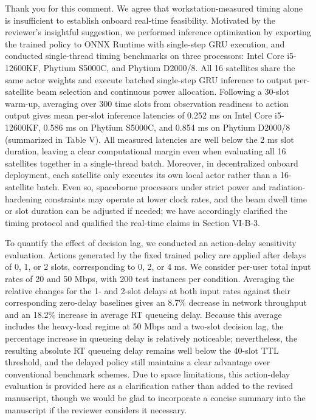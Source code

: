 \documentclass[11pt,a4paper]{article}
\begin{document}
Thank you for this comment. We agree that workstation-measured timing alone is insufficient to establish onboard real-time feasibility. Motivated by the reviewer's insightful suggestion, we performed inference optimization by exporting the trained policy to ONNX Runtime with single-step GRU execution, and conducted single-thread timing benchmarks on three processors: Intel Core i5-12600KF, Phytium S5000C, and Phytium D2000/8. All 16 satellites share the same actor weights and execute batched single-step GRU inference to output per-satellite beam selection and continuous power allocation. Following a 30-slot warm-up, averaging over 300 time slots from observation readiness to action output gives mean per-slot inference latencies of 0.252 ms on Intel Core i5-12600KF, 0.586 ms on Phytium S5000C, and 0.854 ms on Phytium D2000/8 (summarized in Table V). All measured latencies are well below the 2 ms slot duration, leaving a clear computational margin even when evaluating all 16 satellites together in a single-thread batch. Moreover, in decentralized onboard deployment, each satellite only executes its own local actor rather than a 16-satellite batch. Even so, spaceborne processors under strict power and radiation-hardening constraints may operate at lower clock rates, and the beam dwell time or slot duration can be adjusted if needed; we have accordingly clarified the timing protocol and qualified the real-time claims in Section VI-B-3.
\par

To quantify the effect of decision lag, we conducted an action-delay sensitivity evaluation. Actions generated by the fixed trained policy are applied after delays of 0, 1, or 2 slots, corresponding to 0, 2, or 4 ms. We consider per-user total input rates of 20 and 50 Mbps, with 200 test instances per condition. Averaging the relative changes for the 1- and 2-slot delays at both input rates against their corresponding zero-delay baselines gives an 8.7\% decrease in network throughput and an 18.2\% increase in average RT queueing delay. Because this average includes the heavy-load regime at 50 Mbps and a two-slot decision lag, the percentage increase in queueing delay is relatively noticeable; nevertheless, the resulting absolute RT queueing delay remains well below the 40-slot TTL threshold, and the delayed policy still maintains a clear advantage over conventional benchmark schemes. Due to space limitations, this action-delay evaluation is provided here as a clarification rather than added to the revised manuscript, though we would be glad to incorporate a concise summary into the manuscript if the reviewer considers it necessary.
\par
\end{document}
